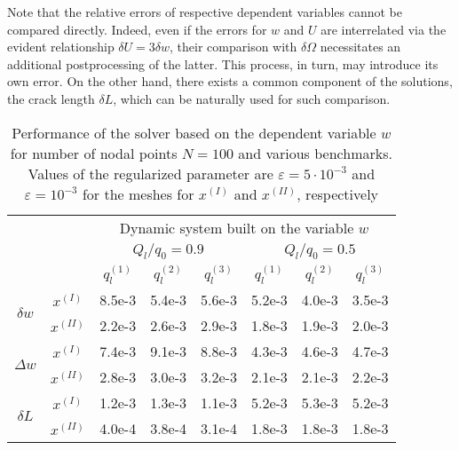 Note that the relative errors of respective dependent variables cannot be compared directly. 
Indeed, even if the errors for $w$ and $U$ are interrelated via the evident relationship $\delta U=3\delta w$, their comparison with $\delta \Omega$ necessitates an additional postprocessing of the latter. This process, in turn, may introduce its own error. On the other hand, there exists a common component of the solutions, the crack length  $\delta L$,
which can be naturally used for such comparison.




\begin{table}
\centering
\begin{tabular}{c c|c@{}|c@{}|c@{}|c@{}|c@{}|c@{}|}
\cline{3-8}
& & \multicolumn{6}{c|}{Dynamic system built on the variable $w$ }\\
\cline{3-8}
& & \multicolumn{3}{c|}{$Q_l/q_0=0.9$} & \multicolumn{3}{c|}{$Q_l/q_0=0.5$} \\ \cline{3-8}
& & $q_l^{(1)}$ & $q_l^{(2)}$ & $q_l^{(3)}$ & $q_l^{(1)}$ & $q_l^{(2)}$ & $q_l^{(3)}$ \\ \cline{1-8}
\multicolumn{1}{|c}{\multirow{2}{*}{$\delta w$}} & \multicolumn{1}{|c|}{$x^{(I)}$}
  &8.5e-3&5.4e-3&5.6e-3&5.2e-3&4.0e-3&3.5e-3
 \\ \cline{2-8} \multicolumn{1}{|c}{} & \multicolumn{1}{|c|}{$x^{(II)}$}
&2.2e-3&2.6e-3&2.9e-3&1.8e-3&1.9e-3&2.0e-3
  \\ \cline{1-8} \multicolumn{1}{|c}{\multirow{2}{*}{$\Delta w$}} & \multicolumn{1}{|c|}{$x^{(I)}$}
&7.4e-3&9.1e-3&8.8e-3&4.3e-3&4.6e-3&4.7e-3
 \\ \cline{2-8} \multicolumn{1}{|c}{} & \multicolumn{1}{|c|}{$x^{(II)}$}
&2.8e-3&3.0e-3&3.2e-3&2.1e-3&2.1e-3&2.2e-3
  \\ \cline{1-8} \multicolumn{1}{|c}{\multirow{2}{*}{$\delta L$}} & \multicolumn{1}{|c|}{$x^{(I)}$}
&1.2e-3&1.3e-3&1.1e-3&5.2e-3&5.3e-3&5.2e-3
 \\ \cline{2-8} \multicolumn{1}{|c}{} & \multicolumn{1}{|c|}{$x^{(II)}$}
&4.0e-4&3.8e-4&3.1e-4&1.8e-3&1.8e-3&1.8e-3
 \\ \cline{1-8}
\end{tabular}
  \caption{Performance of the solver based on the dependent variable $w$ for number of nodal points $N=100$ and various benchmarks.
 Values of the regularized parameter are $\varepsilon=5\cdot10^{-3}$ and $\varepsilon=10^{-3}$ for the meshes for $x^{(I)}$  and $x^{(II)}$, respectively}
\label{table_w}
\end{table}




